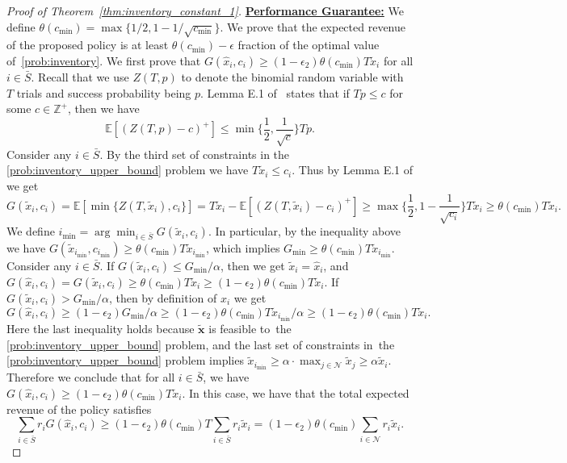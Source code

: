 \documentclass[mnsc,non-blindrev]{informs3}
\theoremstyle{definition}
\begin{document}
\begin{proof}[Proof of Theorem~\ref{thm:inventory_constant_1}]
\noindent\underline{\bf Performance Guarantee:} We define $\theta(c_{\min})=\max\{{1}/{2},1-{1}/{\sqrt{c_{\min}}}\}$. We prove that the expected revenue of the proposed policy is at least $\theta(c_{\min})-\epsilon$ fraction of the optimal value of~\ref{prob:inventory}. We first prove that $G(\hat{x}_i,c_i)\geq (1-\epsilon_2)\theta(c_{\min})T\tilde{x}_i$ for all $i\in\bar{S}$. Recall that we use $Z(T,p)$ to denote the binomial random variable with $T$ trials and success probability being $p$. Lemma E.1 of \cite{bai2022coordinated}~states that if $Tp\leq c$ for some $c\in\mathbb{Z}^+$, then we have
\begin{equation*}
\mathbb{E}[(Z(T,p)-c)^+]\leq \min\Big\{\dfrac{1}{2},\dfrac{1}{\sqrt{c}}\Big\}Tp.
\end{equation*}
Consider any $i\in\bar{S}$. By the third set of constraints in the \ref{prob:inventory_upper_bound} problem we have $T\tilde{x}_i\leq c_i$. Thus by Lemma E.1 of  \cite{bai2022coordinated} we get
\begin{equation*}
G(\tilde{x}_i,c_i)=\mathbb{E}[\min\{Z(T,\tilde{x}_i),c_i\}]=T\tilde{x}_i-\mathbb{E}[(Z(T,\tilde{x}_i)-c_i)^+]\geq \max\Big\{\dfrac{1}{2},1-\dfrac{1}{\sqrt{c_i}}\Big\}T\tilde{x}_i\geq \theta(c_{\min})T\tilde{x}_i.
\end{equation*}
We define $i_{\min}=\arg\min_{i\in\bar{S}}G(\tilde{x}_i,c_i)$. In particular, by the inequality above we have \mbox{$G(\tilde{x}_{i_{\min}},c_{i_{\min}})\geq \theta(c_{\min})T\tilde{x}_{i_{\min}}$}, which implies $G_{\min}\geq \theta(c_{\min})T\tilde{x}_{i_{\min}}$. Consider any $i\in\bar{S}$. If $G(\tilde{x}_i,c_i)\leq G_{\min}/\alpha$, then we get $\tilde{x}_i=\hat{x}_i$, and $G(\hat{x}_i,c_i)=G(\tilde{x}_i,c_i)\geq \theta(c_{\min})T\tilde{x}_i\geq (1-\epsilon_2)\theta(c_{\min})T\tilde{x}_i$. If $G(\tilde{x}_i,c_i)>G_{\min}/\alpha$, then by definition of $\hat{x}_i$ we get
\begin{equation*}
G(\hat{x}_i,c_i)\geq (1-\epsilon_2)G_{\min}/\alpha\geq (1-\epsilon_2)\theta(c_{\min})T\tilde{x}_{i_{\min}}/\alpha\geq (1-\epsilon_2)\theta(c_{\min})T\tilde{x}_i.
\end{equation*}
Here the last inequality holds because $\tilde{\bm{x}}$ is feasible to~the \ref{prob:inventory_upper_bound} problem, and the last set of constraints in~the \ref{prob:inventory_upper_bound} problem implies \mbox{$\tilde{x}_{i_{\min}}\geq \alpha\cdot\max_{j\in\mathcal{N}}\tilde{x}_j\geq \alpha \tilde{x}_i$.} Therefore we conclude that for all $i\in\bar{S}$, we have $G(\hat{x}_i,c_i)\geq (1-\epsilon_2)\theta(c_{\min})T\tilde{x}_i$. In this case, we have that the total expected revenue of the policy satisfies
\begin{equation*}
\sum_{i\in\bar{S}}r_iG(\hat{x}_i,c_i)\geq (1-\epsilon_2)\theta(c_{\min})T\sum_{i\in\bar{S}}r_i\tilde{x}_i=(1-\epsilon_2)\theta(c_{\min})\sum_{i\in\mathcal{N}}r_i\tilde{x}_i.
\end{equation*}


\end{proof}
\end{document}
